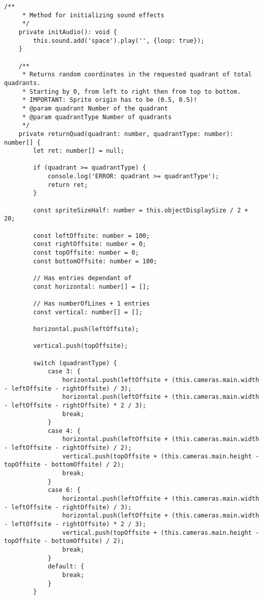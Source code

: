 \begin{lstlisting}[style=TypeScript, caption={sortingScene.ts}]
    /**
     * Method for initializing sound effects
     */
    private initAudio(): void {
        this.sound.add('space').play('', {loop: true});
    }

    /**
     * Returns random coordinates in the requested quadrant of total quadrants.
     * Starting by 0, from left to right then from top to bottom.
     * IMPORTANT: Sprite origin has to be (0.5, 0.5)!
     * @param quadrant Number of the quadrant
     * @param quadrantType Number of quadrants
     */
    private returnQuad(quadrant: number, quadrantType: number): number[] {
        let ret: number[] = null;

        if (quadrant >= quadrantType) {
            console.log('ERROR: quadrant >= quadrantType');
            return ret;
        }

        const spriteSizeHalf: number = this.objectDisplaySize / 2 + 20;

        const leftOffsite: number = 100;
        const rightOffsite: number = 0;
        const topOffsite: number = 0;
        const bottomOffsite: number = 100;

        // Has entries dependant of
        const horizontal: number[] = [];

        // Has numberOfLines + 1 entries
        const vertical: number[] = [];

        horizontal.push(leftOffsite);

        vertical.push(topOffsite);

        switch (quadrantType) {
            case 3: {
                horizontal.push(leftOffsite + (this.cameras.main.width - leftOffsite - rightOffsite) / 3);
                horizontal.push(leftOffsite + (this.cameras.main.width - leftOffsite - rightOffsite) * 2 / 3);
                break;
            }
            case 4: {
                horizontal.push(leftOffsite + (this.cameras.main.width - leftOffsite - rightOffsite) / 2);
                vertical.push(topOffsite + (this.cameras.main.height - topOffsite - bottomOffsite) / 2);
                break;
            }
            case 6: {
                horizontal.push(leftOffsite + (this.cameras.main.width - leftOffsite - rightOffsite) / 3);
                horizontal.push(leftOffsite + (this.cameras.main.width - leftOffsite - rightOffsite) * 2 / 3);
                vertical.push(topOffsite + (this.cameras.main.height - topOffsite - bottomOffsite) / 2);
                break;
            }
            default: {
                break;
            }
        }


\end{lstlisting}
